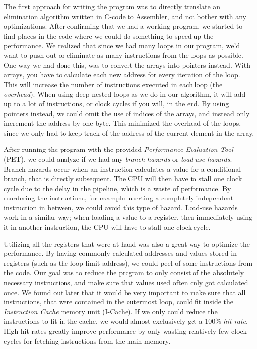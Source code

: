 \documentclass[a4paper,9pt,fleqn]{article}
\begin{document}
The first approach for writing the program was to directly translate an elimination algorithm written
in C-code to Assembler, and not bother with any optimizations. After confirming that we had a working
program, we started to find places in the code where we could do something to speed up the performance.
We realized that since we had many loops in our program, we'd want to push out or eliminate as many
instructions from the loops as possible. One way we had done this, was to convert the arrays
into pointers instead. With arrays, you have to calculate each new address for every iteration of the loop.
This will increase the number of instructions executed in each loop (the {\it overhead}). When using
deep-nested loops as we do in our algorithm, it will add up to a lot of instructions, or clock cycles if
you will, in the end. By using pointers instead, we could omit the use of indices of the arrays, and instead
only increment the address by one byte. This minimized the overhead of the loops, since we only had to
keep track of the address of the current element in the array.

After running the program with the provided {\it Performance Evaluation Tool} (PET), we could analyze if
we had any {\it branch hazards} or {\it load-use hazards}. Branch hazards occur when an instruction
calculates a value for a conditional branch, that is directly subsequent. The CPU will then have to stall
one clock cycle due to the delay in the pipeline, which is a waste of performance. By reordering the
instructions, for example inserting a completely independent instruction in between, we could avoid
this type of hazard. Load-use hazards work in a similar way; when loading a value to a register,
then immediately using it in another instruction, the CPU will have to stall one clock cycle.

Utilizing all the registers that were at hand was also a great way to optimize the performance. By having
commonly calculated addresses and values stored in registers (such as the loop limit address), we could
peel of some instructions from the code. Our goal was to reduce the program to only consist of the absolutely
necessary instructions, and make sure that values used often only got calculated once. We found out later that
it would be very important to make sure that  all instructions, that were contained in the outermost loop, could
fit inside the {\it Instruction Cache} memory unit (I-Cache). If we only could reduce the instructions
to fit in the cache, we would almost exclusively get a 100\% {\it hit rate}. High hit rates
greatly improve performance by only wasting relatively few clock cycles for fetching instructions from the
main memory.
\end{document}

